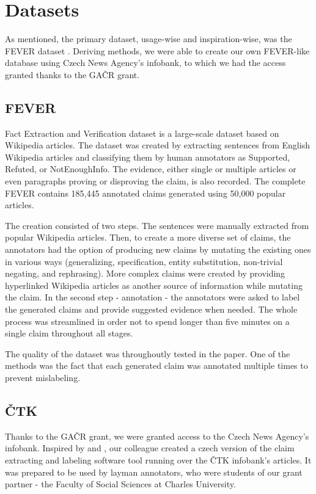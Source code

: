 \chapter{Datasets}
\label{chap:data}

As mentioned, the primary dataset, usage-wise and inspiration-wise, was the FEVER dataset \citep{fever}.
Deriving \cite{fever} methods, we \citep{ullrich} were able to create our own FEVER-like database using Czech News Agency's infobank, to which we had the access granted thanks to the GAČR grant.  

\section{FEVER}

Fact Extraction and Verification \citep{fever} dataset is a large-scale dataset based on Wikipedia articles.
The dataset was created by extracting sentences from English Wikipedia articles and classifying them by human annotators as Supported, Refuted, or NotEnoughInfo.
The evidence, either single or multiple articles or even paragraphs proving or disproving the claim, is also recorded.
The complete FEVER contains 185,445 annotated claims generated using 50,000 popular articles.

The creation consisted of two steps. The sentences were manually extracted from popular Wikipedia articles.
Then, to create a more diverse set of claims, the annotators had the option of producing new claims by mutating the existing ones in various ways (generalizing, specification, entity substitution, non-trivial negating, and rephrasing).
More complex claims were created by providing hyperlinked Wikipedia articles as another source of information while mutating the claim.
In the second step - annotation - the annotators were asked to label the generated claims and provide suggested evidence when needed.
The whole process was streamlined in order not to spend longer than five minutes on a single claim throughout all stages.

The quality of the dataset was throughoutly tested in the paper.
One of the methods was the fact that each generated claim was annotated multiple times to prevent mislabeling.

\section{ČTK}

Thanks to the GAČR grant, we were granted access to the Czech News Agency's infobank. 
Inspired by \cite{fever} and \cite{danish_fever}, our colleague \cite{ullrich} created a czech version of the claim extracting and labeling software tool running over the ČTK infobank's articles. 
It was prepared to be used by layman annotators, who were students of our grant partner - the Faculty of Social Sciences at Charles University.


